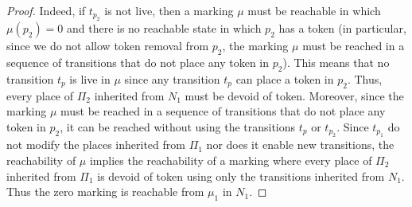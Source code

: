 \begin{proof}
Indeed, if $t_{p_2}$ is not live, then a marking $\mu$ must be reachable in which $\mu(p_2) = 0$ and there is no reachable state in which $p_2$ has a token (in particular, since we do not allow token removal from $p_2$, the marking $\mu$ must be reached in a sequence of transitions that do not place any token in $p_2$).
This means that no transition $t_p$ is live in $\mu$ since any transition $t_p$ can place a token in $p_2$. 
Thus, every place of $\Pi_2$ inherited from $N_1$ must be devoid of token. Moreover, since the marking $\mu$ must be reached  in a sequence of transitions that do not place any token in $p_2$, 
it can be reached without using the transitions $t_p$ or $t_{p_2}$. Since $t_{p_1}$ do not modify the places inherited from $\Pi_1$ nor does it enable new transitions, the reachability of $\mu$ implies the reachability of a marking where every place of $\Pi_2$ inherited from $\Pi_1$ is devoid of token using only the transitions inherited from $N_1$. Thus the zero marking is reachable from $\mu_1$ in $N_1$.
\end{proof}








